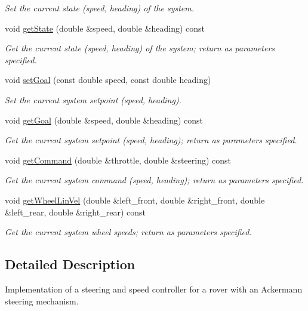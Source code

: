 \begin{DoxyCompactItemize}
\begin{DoxyCompactList}\small\item\em Set the current state (speed, heading) of the system. \end{DoxyCompactList}\item 
void \hyperlink{classackermann_1_1_controller_a6a282c7083ce5a240d5e8e71782cb106}{get\+State} (double \&speed, double \&heading) const
\begin{DoxyCompactList}\small\item\em Get the current state (speed, heading) of the system; return as parameters specified. \end{DoxyCompactList}\item 
void \hyperlink{classackermann_1_1_controller_a2c048f93364371bb99445b68cb4ad064}{set\+Goal} (const double speed, const double heading)
\begin{DoxyCompactList}\small\item\em Set the current system setpoint (speed, heading). \end{DoxyCompactList}\item 
void \hyperlink{classackermann_1_1_controller_ad768d0fdc4ad85510ba90af05ef6e4c4}{get\+Goal} (double \&speed, double \&heading) const
\begin{DoxyCompactList}\small\item\em Get the current system setpoint (speed, heading); return as parameters specified. \end{DoxyCompactList}\item 
void \hyperlink{classackermann_1_1_controller_a4af9cff4fa372a7bd245fe50aaf05859}{get\+Command} (double \&throttle, double \&steering) const
\begin{DoxyCompactList}\small\item\em Get the current system command (speed, heading); return as parameters specified. \end{DoxyCompactList}\item 
void \hyperlink{classackermann_1_1_controller_ab1831f2b1e80c29e5d110c55e11e2d2e}{get\+Wheel\+Lin\+Vel} (double \&left\+\_\+front, double \&right\+\_\+front, double \&left\+\_\+rear, double \&right\+\_\+rear) const
\begin{DoxyCompactList}\small\item\em Get the current system wheel speeds; return as parameters specified. \end{DoxyCompactList}\end{DoxyCompactItemize}


\subsection{Detailed Description}
Implementation of a steering and speed controller for a rover with an Ackermann steering mechanism. 

